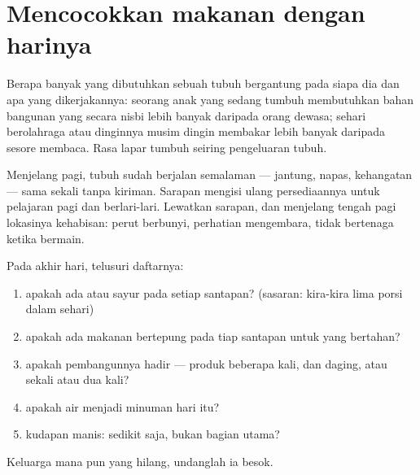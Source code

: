 \section{Mencocokkan makanan dengan harinya}

\begin{proposition}\label{prop:g3:balanced-diet:needs}
Berapa banyak  yang dibutuhkan sebuah tubuh bergantung pada
siapa dia dan apa yang dikerjakannya: seorang anak yang sedang tumbuh
membutuhkan bahan bangunan yang secara nisbi lebih banyak daripada
orang dewasa; sehari berolahraga atau dinginnya musim dingin membakar
lebih banyak  daripada sesore membaca. Rasa lapar tumbuh seiring
pengeluaran tubuh.
\end{proposition}
\admitted

\begin{example}\label{ex:g3:balanced-diet:breakfast}
Menjelang pagi, tubuh sudah berjalan semalaman --- jantung, napas,
kehangatan --- sama sekali tanpa kiriman. Sarapan mengisi ulang
persediaannya untuk pelajaran pagi dan berlari-lari. Lewatkan sarapan,
dan menjelang tengah pagi lokasinya kehabisan: perut berbunyi,
perhatian mengembara, tidak bertenaga ketika bermain.
\end{example}

\begin{method}\label{met:g3:balanced-diet:check}
Pada akhir hari, telusuri daftarnya:
\begin{enumerate}
  \item apakah ada  atau sayur pada setiap santapan? (sasaran:
        kira-kira lima porsi dalam sehari)
  \item apakah ada makanan bertepung pada tiap santapan untuk 
        yang bertahan?
  \item apakah pembangunnya hadir --- produk  beberapa kali, dan
        daging,  atau  sekali atau dua kali?
  \item apakah air menjadi minuman hari itu?
  \item kudapan manis: sedikit saja, bukan bagian utama?
\end{enumerate}
Keluarga mana pun yang hilang, undanglah ia besok.
\end{method}

